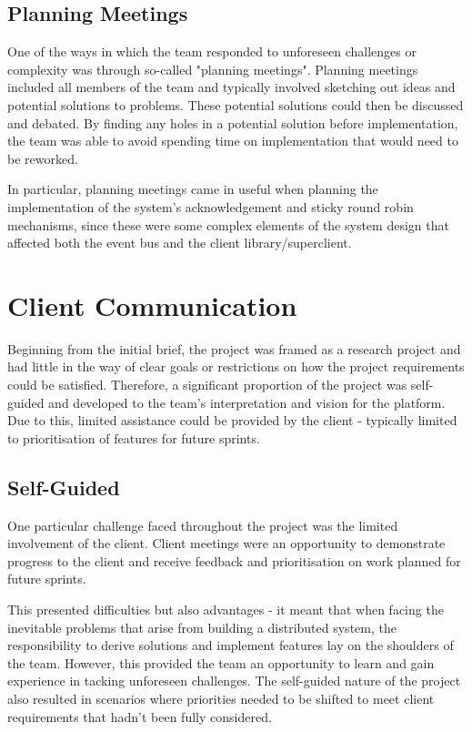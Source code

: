 \documentclass{l3proj}
\begin{document}
\subsection{Planning Meetings}
One of the ways in which the team responded to unforeseen challenges or complexity was through so-called "planning meetings". Planning meetings included all members of the team and typically involved sketching out ideas and potential solutions to problems. These potential solutions could then be discussed and debated. By finding any holes in a potential solution before implementation, the team was able to avoid spending time on implementation that would need to be reworked.

In particular, planning meetings came in useful when planning the implementation of the system's acknowledgement and sticky round robin mechanisms, since these were some complex elements of the system design that affected both the event bus and the client library/superclient.

\section{Client Communication}
\label{sec:client-communication}
Beginning from the initial brief, the project was framed as a research project and had little in the way of clear goals or restrictions on how the project requirements could be satisfied. Therefore, a significant proportion of the project was self-guided and developed to the team's interpretation and vision for the platform. Due to this, limited assistance could be provided by the client - typically limited to prioritisation of features for future sprints.

\subsection{Self-Guided}
One particular challenge faced throughout the project was the limited involvement of the client. Client meetings were an opportunity to demonstrate progress to the client and receive feedback and prioritisation on work planned for future sprints.

This presented difficulties but also advantages - it meant that when facing the inevitable problems that arise from building a distributed system, the responsibility to derive solutions and implement features lay on the shoulders of the team. However, this provided the team an opportunity to learn and gain experience in tacking unforeseen challenges. The self-guided nature of the project also resulted in scenarios where priorities needed to be shifted to meet client requirements that hadn't been fully considered.
\end{document}
